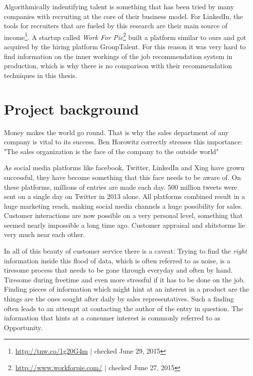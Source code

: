 Algorithmically indentifying talent is something that has been tried by many
companies with recruiting at the core of their business model.
For LinkedIn, the tools for recruiters that are fueled by this research are
their main source of income\footnote{\url{http://tnw.co/1g20G4m} | checked June 29, 2015}.
A startup called \textit{Work For Pie}\footnote{\url{http://www.workforpie.com/} | checked June 27, 2015}
built a platform similar to ours and got acquired by the hiring platform GroupTalent.
For this reason it was very hard to find information on the inner workings of the
job recommendation system in production, which is why there is no comparison with their
recommendation techniques in this thesis.

\section{Project background}
Money makes the world go round. That is why the sales department
of any company is vital to its success. Ben Horowitz correctly
stresses this importance: "The sales organization is the face of the company to the outside world"\cite{bh:2014}

As social media platforms like facebook, Twitter, LinkedIn and Xing
have grown successful, they have become something that this face needs to be aware of.
On these platforms, millions of entries are made each day.
500 million tweets were sent on a single day on Twitter in 2013 alone.
All platforms combined result in a huge marketing reach,
making social media channels a huge possibility for sales.
Customer interactions are now possible on a very personal level,
something that seemed nearly impossible a long time ago.
Customer appraisal and shitstorms lie very much near each other.
\newline

In all of this beauty of customer service there is a caveat:
Trying to find the \textit{right} information inside this
flood of data, which is often referred to as noise, is a tiresome
process that needs to be gone through everyday and often by hand.
Tiresome during freetime and even more stressful if it has to be done on the job.
Finding pieces of information which might hint at an interest
in a product are the things are the ones sought after daily by sales representatives.
Such a finding often leads to an attempt at contacting the author of the
entry in question. The information that hints at a consumer interest is commonly
referred to as Opportunity.

